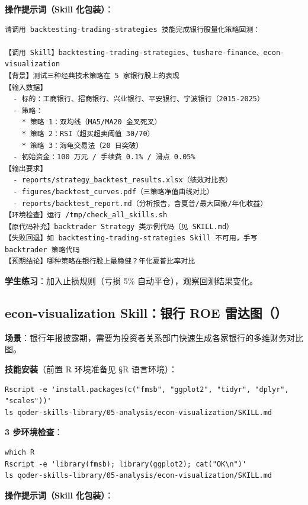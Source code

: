 \textbf{操作提示词（Skill 化包装）}：

\begin{lstlisting}
请调用 backtesting-trading-strategies 技能完成银行股量化策略回测：

【调用 Skill】backtesting-trading-strategies、tushare-finance、econ-visualization
【背景】测试三种经典技术策略在 5 家银行股上的表现
【输入数据】
  - 标的：工商银行、招商银行、兴业银行、平安银行、宁波银行（2015-2025）
  - 策略：
    * 策略 1：双均线（MA5/MA20 金叉死叉）
    * 策略 2：RSI（超买超卖阈值 30/70）
    * 策略 3：海龟交易法（20 日突破）
  - 初始资金：100 万元 / 手续费 0.1% / 滑点 0.05%
【输出要求】
  - reports/strategy_backtest_results.xlsx（绩效对比表）
  - figures/backtest_curves.pdf（三策略净值曲线对比）
  - reports/backtest_report.md（分析报告，含夏普/最大回撤/年化收益）
【环境检查】运行 /tmp/check_all_skills.sh
【原代码补充】backtrader Strategy 类示例代码（见 SKILL.md）
【失败回退】如 backtesting-trading-strategies Skill 不可用，手写 backtrader 策略代码
【预期结论】哪种策略在银行股上最稳健？年化夏普比率对比
\end{lstlisting}

\textbf{学生练习}：加入止损规则（亏损 5\% 自动平仓），观察回测结果变化。

\subsection{econ-visualization Skill：银行 ROE 雷达图（）}

\textbf{场景}：银行年报披露期，需要为投资者关系部门快速生成各家银行的多维财务对比图。

\textbf{技能安装}（前置 R 环境准备见 §R 语言环境）：

\begin{lstlisting}[style=shell]
Rscript -e 'install.packages(c("fmsb", "ggplot2", "tidyr", "dplyr", "scales"))'
ls qoder-skills-library/05-analysis/econ-visualization/SKILL.md
\end{lstlisting}

\textbf{3 步环境检查}：
\begin{lstlisting}[style=shell]
which R
Rscript -e 'library(fmsb); library(ggplot2); cat("OK\n")'
ls qoder-skills-library/05-analysis/econ-visualization/SKILL.md
\end{lstlisting}

\textbf{操作提示词（Skill 化包装）}：

